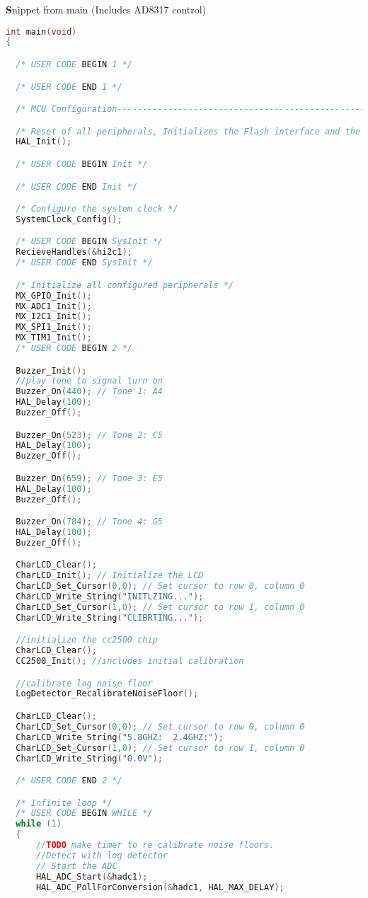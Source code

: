 \documentclass[12pt]{article}
\begin{document}
\textbf Snippet from main (Includes AD8317 control)
\begin{lstlisting}[language=C]
int main(void)
{

  /* USER CODE BEGIN 1 */

  /* USER CODE END 1 */

  /* MCU Configuration--------------------------------------------------------*/

  /* Reset of all peripherals, Initializes the Flash interface and the Systick. */
  HAL_Init();

  /* USER CODE BEGIN Init */

  /* USER CODE END Init */

  /* Configure the system clock */
  SystemClock_Config();

  /* USER CODE BEGIN SysInit */
  RecieveHandles(&hi2c1);
  /* USER CODE END SysInit */

  /* Initialize all configured peripherals */
  MX_GPIO_Init();
  MX_ADC1_Init();
  MX_I2C1_Init();
  MX_SPI1_Init();
  MX_TIM1_Init();
  /* USER CODE BEGIN 2 */

  Buzzer_Init();
  //play tone to signal turn on
  Buzzer_On(440); // Tone 1: A4
  HAL_Delay(100);
  Buzzer_Off();

  Buzzer_On(523); // Tone 2: C5
  HAL_Delay(100);
  Buzzer_Off();

  Buzzer_On(659); // Tone 3: E5
  HAL_Delay(100);
  Buzzer_Off();

  Buzzer_On(784); // Tone 4: G5
  HAL_Delay(100);
  Buzzer_Off();

  CharLCD_Clear();
  CharLCD_Init(); // Initialize the LCD
  CharLCD_Set_Cursor(0,0); // Set cursor to row 0, column 0
  CharLCD_Write_String("INITLZING...");
  CharLCD_Set_Cursor(1,0); // Set cursor to row 1, column 0
  CharLCD_Write_String("CLIBRTING...");

  //initialize the cc2500 chip
  CharLCD_Clear();
  CC2500_Init(); //includes initial calibration

  //calibrate log noise floor
  LogDetector_RecalibrateNoiseFloor();

  CharLCD_Clear();
  CharLCD_Set_Cursor(0,0); // Set cursor to row 0, column 0
  CharLCD_Write_String("5.8GHZ:  2.4GHZ:");
  CharLCD_Set_Cursor(1,0); // Set cursor to row 1, column 0
  CharLCD_Write_String("0.0V");

  /* USER CODE END 2 */

  /* Infinite loop */
  /* USER CODE BEGIN WHILE */
  while (1)
  {
	  //TODO make timer to re calibrate noise floors.
	  //Detect with log detector
	  // Start the ADC
	  HAL_ADC_Start(&hadc1);
	  HAL_ADC_PollForConversion(&hadc1, HAL_MAX_DELAY);


\end{lstlisting}
\end{document}
